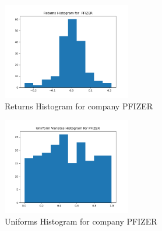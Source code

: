 \documentclass[a4paper,12pt]{article}
\begin{document}
\begin{figure}[h]

\centering
\includegraphics[width=0.5\textwidth]{pfizer_returns_histogram}
\caption{Returns Histogram for company PFIZER}
\label{image-pfizer_hist}

\end{figure} 
 
\begin{figure}[h]

\centering
\includegraphics[width=0.5\textwidth]{pfizer_uniforms_histogram}
\caption{Uniforms Histogram for company PFIZER}
\label{image-pfizer_hist1}

\end{figure} 


\clearpage
\end{document}
